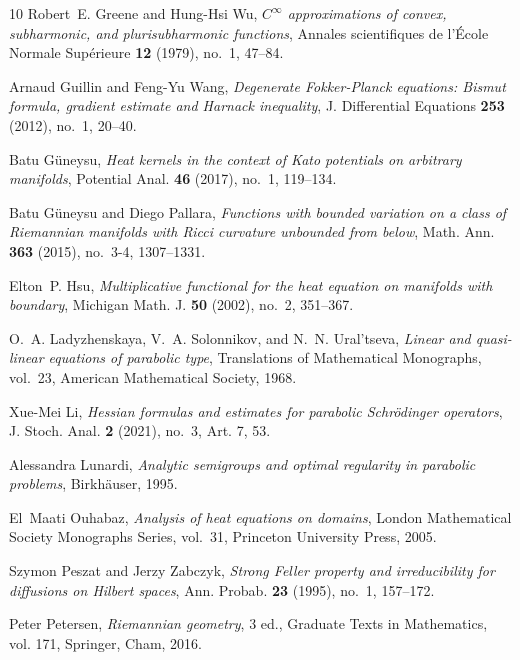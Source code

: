 \documentclass[11pt,twoside, reqno]{article}
\newcommand\1{\mathbbm{1}}
\theoremstyle{definition}
\numberwithin{equation}{section}
\begin{document}
\begin{thebibliography}{10}
Robert~E. Greene and Hung-Hsi Wu, \emph{${C}^\infty$ approximations of convex,
  subharmonic, and plurisubharmonic functions}, Annales scientifiques de
  l'\'Ecole Normale Sup\'erieure \textbf{12} (1979), no.~1, 47--84.

Arnaud Guillin and Feng-Yu Wang, \emph{Degenerate {F}okker-{P}lanck equations:
  {B}ismut formula, gradient estimate and {H}arnack inequality}, J.
  Differential Equations \textbf{253} (2012), no.~1, 20--40. 

Batu G\"uneysu, \emph{Heat kernels in the context of {K}ato potentials on
  arbitrary manifolds}, Potential Anal. \textbf{46} (2017), no.~1, 119--134.

Batu G\"uneysu and Diego Pallara, \emph{Functions with bounded variation on a
  class of {R}iemannian manifolds with {R}icci curvature unbounded from below},
  Math. Ann. \textbf{363} (2015), no.~3-4, 1307--1331. 

Elton~P. Hsu, \emph{Multiplicative functional for the heat equation on
  manifolds with boundary}, Michigan Math. J. \textbf{50} (2002), no.~2,
  351--367. 

O.~A. Ladyzhenskaya, V.~A. Solonnikov, and N.~N. Ural'tseva, \emph{Linear and
  quasi-linear equations of parabolic type}, Translations of Mathematical
  Monographs, vol.~23, American Mathematical Society, 1968.

Xue-Mei Li, \emph{Hessian formulas and estimates for parabolic
  {S}chr\"{o}dinger operators}, J. Stoch. Anal. \textbf{2} (2021), no.~3, Art.
  7, 53. 

Alessandra Lunardi, \emph{Analytic semigroups and optimal regularity in
  parabolic problems}, Birkh{\"a}user, 1995.

El~Maati Ouhabaz, \emph{Analysis of heat equations on domains}, London
  Mathematical Society Monographs Series, vol.~31, Princeton University Press,
  2005.

Szymon Peszat and Jerzy Zabczyk, \emph{Strong {F}eller property and
  irreducibility for diffusions on {H}ilbert spaces}, Ann. Probab. \textbf{23}
  (1995), no.~1, 157--172. 

Peter Petersen, \emph{Riemannian geometry}, 3 ed., Graduate Texts in
  Mathematics, vol. 171, Springer, Cham, 2016.


\end{thebibliography}
\end{document}
